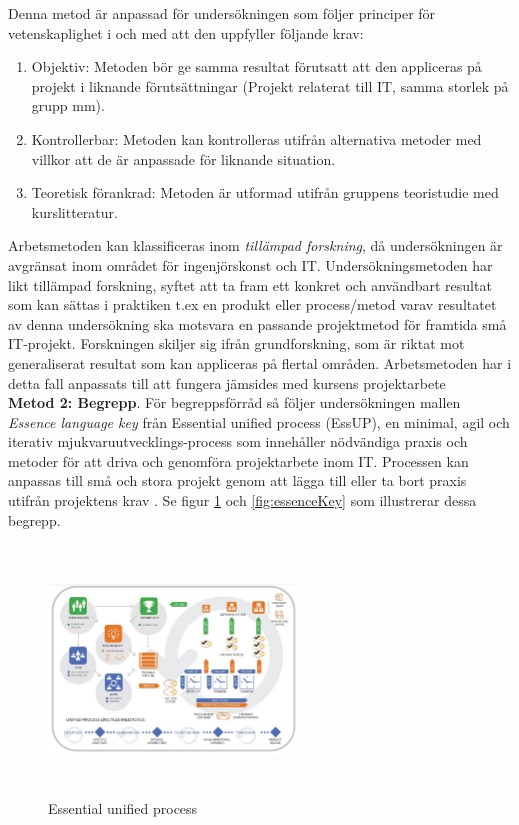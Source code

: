 \documentclass[conference]{IEEEtran}
\begin{document}
Denna metod är anpassad för undersökningen som följer principer för vetenskaplighet i och med att den uppfyller följande krav:
\begin{enumerate}
    \item Objektiv: Metoden bör ge samma resultat förutsatt att den appliceras på projekt i liknande förutsättningar 
    (Projekt relaterat till IT, samma storlek på grupp mm).
    \item Kontrollerbar: Metoden kan kontrolleras utifrån alternativa metoder med villkor att de är anpassade för
    liknande situation.
    \item Teoretisk förankrad: Metoden är utformad utifrån gruppens teoristudie med kurslitteratur.
\end{enumerate}

Arbetsmetoden kan klassificeras inom \textit{tillämpad forskning}, då undersökningen är avgränsat inom området för ingenjörskonst och IT. 
Undersökningsmetoden har likt tillämpad forskning, syftet att ta fram ett konkret och användbart resultat som kan sättas 
i praktiken t.ex en produkt eller process/metod varav resultatet av denna undersökning ska motsvara en passande projektmetod för 
framtida små IT-projekt. Forskningen skiljer sig ifrån grundforskning, som är riktat mot generaliserat resultat som kan appliceras 
på flertal områden. Arbetsmetoden har i detta fall anpassats till att fungera jämsides med kursens projektarbete\cite{IT-BoF:3}\\

\textbf{Metod 2: Begrepp}.
För begreppsförråd så följer undersökningen mallen \textit{Essence language key} från Essential unified process (EssUP), 
en minimal, agil och iterativ mjukvaruutvecklings-process som innehåller nödvändiga praxis och metoder 
för att driva och genomföra projektarbete inom IT. Processen kan anpassas till små och stora projekt genom att 
lägga till eller ta bort praxis utifrån projektens krav \cite{Jacobson:4}. 
Se figur \ref{fig:ivar} och \ref{fig:essenceKey} som illustrerar dessa begrepp.

\begin{figure}[h!]
    \centerline{\includegraphics[max height=250px, max width=250px]{images/ivar.jpg}}
    \caption{Essential unified process}
    \label{fig:ivar}
\end{figure}
\end{document}
